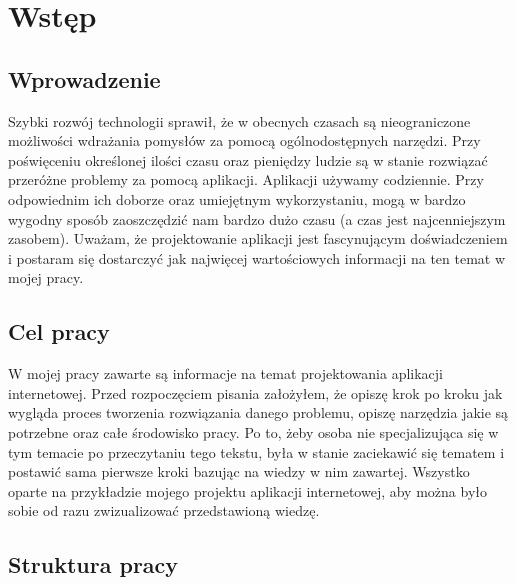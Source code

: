 \chapter{Wstęp}

\section{Wprowadzenie}
Szybki rozwój technologii sprawił, że w obecnych czasach są nieograniczone możliwości wdrażania pomysłów za pomocą ogólnodostępnych narzędzi. Przy poświęceniu określonej ilości czasu oraz pieniędzy ludzie są w stanie rozwiązać przeróżne problemy za pomocą aplikacji. Aplikacji używamy codziennie. Przy odpowiednim ich doborze oraz umiejętnym wykorzystaniu, mogą w bardzo wygodny sposób zaoszczędzić nam bardzo dużo czasu (a czas jest najcenniejszym zasobem). Uważam, że projektowanie aplikacji jest fascynującym doświadczeniem i postaram się dostarczyć jak najwięcej wartościowych informacji na ten temat w mojej pracy.

\section{Cel pracy}
W mojej pracy zawarte są informacje na temat projektowania aplikacji internetowej. Przed rozpoczęciem pisania założyłem, że opiszę krok po kroku jak wygląda proces tworzenia rozwiązania danego problemu, opiszę narzędzia jakie są potrzebne oraz całe środowisko pracy. Po to, żeby osoba nie specjalizująca się w tym temacie po przeczytaniu tego tekstu, była w stanie zaciekawić się tematem i postawić sama pierwsze kroki bazując na wiedzy w nim zawartej. Wszystko oparte na przykładzie mojego projektu aplikacji internetowej, aby można było sobie od razu zwizualizować przedstawioną wiedzę.

\section{Struktura pracy}